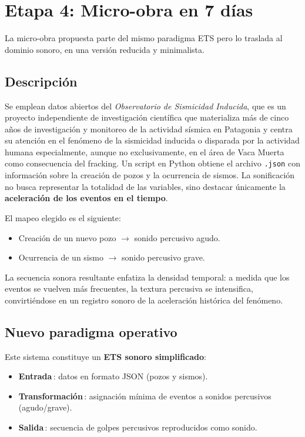 \documentclass[spanish]{report}
\begin{document}
\section{Etapa 4: Micro-obra en 7 días}
La micro-obra propuesta parte del mismo paradigma ETS pero lo traslada al dominio sonoro, en una versión reducida y minimalista.  

\subsection*{Descripción}
Se emplean datos abiertos del \emph{Observatorio de Sismicidad Inducida},  que es un proyecto independiente de investigación científica que materializa más de cinco años de investigación y monitoreo de la actividad sísmica en Patagonia y centra su atención en el fenómeno de la sismicidad inducida o disparada por la actividad humana especialmente, aunque no exclusivamente, en el área de Vaca Muerta como consecuencia del fracking. 
Un script en Python obtiene el archivo \texttt{.json} con información sobre la creación de pozos y la ocurrencia de sismos.  
La sonificación no busca representar la totalidad de las variables, sino destacar únicamente la \textbf{aceleración de los eventos en el tiempo}.  

El mapeo elegido es el siguiente:
\begin{itemize}
    \item Creación de un nuevo pozo $\rightarrow$ sonido percusivo agudo.  
    \item Ocurrencia de un sismo $\rightarrow$ sonido percusivo grave.  
\end{itemize}

La secuencia sonora resultante enfatiza la densidad temporal: 
a medida que los eventos se vuelven más frecuentes, la textura percusiva se intensifica, 
convirtiéndose en un registro sonoro de la aceleración histórica del fenómeno.

\subsection*{Nuevo paradigma operativo}
Este sistema constituye un \textbf{ETS sonoro simplificado}:  
\begin{itemize}
    \item \textbf{Entrada}\,: datos en formato JSON (pozos y sismos).  
    \item \textbf{Transformación}\,: asignación mínima de eventos a sonidos percusivos (agudo/grave).  
    \item \textbf{Salida}\,: secuencia de golpes percusivos reproducidos como sonido.  
\end{itemize}
\end{document}
